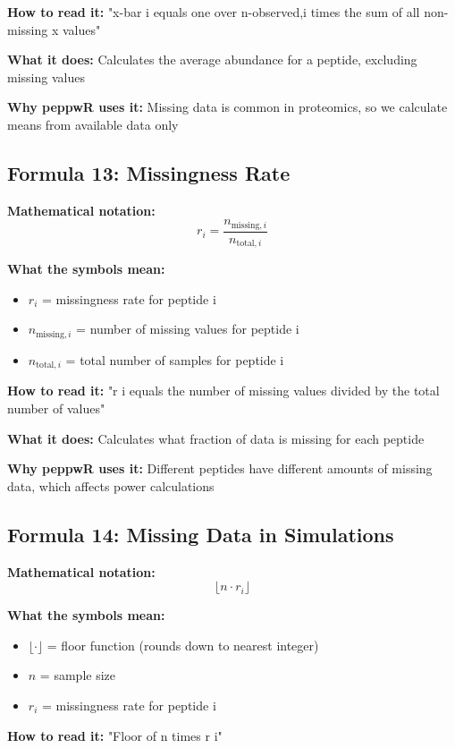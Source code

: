 \documentclass[11pt]{article}
\begin{document}
\textbf{How to read it:} "x-bar i equals one over n-observed,i times the sum of all non-missing x values"

\textbf{What it does:} Calculates the average abundance for a peptide, excluding missing values

\textbf{Why peppwR uses it:} Missing data is common in proteomics, so we calculate means from available data only

\subsection{Formula 13: Missingness Rate}

\textbf{Mathematical notation:}
\[r_i = \frac{n_{\text{missing},i}}{n_{\text{total},i}}\]

\textbf{What the symbols mean:}
\begin{itemize}
\item $r_i$ = missingness rate for peptide i
\item $n_{\text{missing},i}$ = number of missing values for peptide i
\item $n_{\text{total},i}$ = total number of samples for peptide i
\end{itemize}

\textbf{How to read it:} "r i equals the number of missing values divided by the total number of values"

\textbf{What it does:} Calculates what fraction of data is missing for each peptide

\textbf{Why peppwR uses it:} Different peptides have different amounts of missing data, which affects power calculations

\subsection{Formula 14: Missing Data in Simulations}

\textbf{Mathematical notation:}
\[\lfloor n \cdot r_i \rfloor\]

\textbf{What the symbols mean:}
\begin{itemize}
\item $\lfloor \cdot \rfloor$ = floor function (rounds down to nearest integer)
\item $n$ = sample size
\item $r_i$ = missingness rate for peptide i
\end{itemize}

\textbf{How to read it:} "Floor of n times r i"
\end{document}
